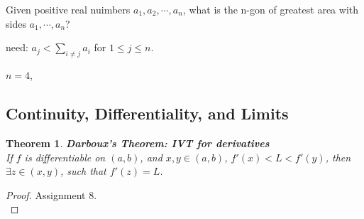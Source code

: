 \documentclass[12pt]{article}
\theoremstyle{plain}
\newtheorem{theorem}{Theorem}[subsection]
\begin{document}
%			
	

Given positive real nuimbers $a_1, a_2, \cdots, a_n$, what is the n-gon of
greatest area with sides $a_1, \cdots, a_n$? 

need: $a_j<\sum_{i\neq j} a_i$ for $1\leq j\leq n$. 

$n=4$, $\frac{}{}$

\newpage

	\subsection{Continuity, Differentiality, and Limits}
	\begin{theorem}\textbf{Darboux's Theorem:	IVT for derivatives}\\
	If $f$ is differentiable on $(a,b)$, 
	and $x,y\in(a,b)$, $f'(x)<L<f'(y)$,
	then $\exists z\in(x,y)$, such that $f'(z) = L$.
	\end{theorem}
	\begin{proof}
		Assignment 8.\\
	\end{proof}
\end{document}
